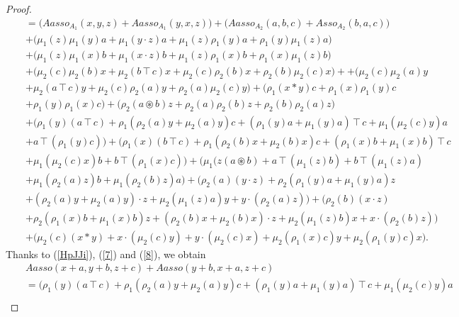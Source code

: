 \documentclass[12pt]{amsart}
\begin{document}
\begin{proof}
\begin{eqnarray}
			&&
			=\Big(Aasso_{A_1}(x,y,z)+Aasso_{A_1}(y,x,z)\Big)
			+\Big(Aasso_{A_2}(a,b,c)+Asso_{A_2}(b,a,c)\Big)\nonumber\\
			&&+
			\Big(\mu_1(z)\mu_1(y)a+\mu_1(y\cdot z)a+\mu_1(z)\rho_1(y)a
			+\rho_1(y)\mu_1(z)a \Big)\nonumber\\
			&&+	\Big(\mu_1(z)\mu_1(x)b+\mu_1(x\cdot z)b+\mu_1(z)\rho_1(x)b+\rho_1(x)\mu_1(z)b \Big)\nonumber\\
			&&+\Big(\mu_2(c)\mu_2(b)x+\mu_2(b\intercal c)x+\mu_2(c)\rho_2(b)x+\rho_2(b)\mu_2(c)x \Big)+
			+\Big(\mu_2(c)\mu_2(a)y\nonumber\\
			&&+\mu_2(a\intercal c)y+\mu_2(c)\rho_2(a)y+\rho_2(a)\mu_2(c)y \Big)+
			\Big(\rho_1(x\ast y)c+\rho_1(x)\rho_1(y)c\nonumber\\
			&&+ \rho_1(y)\rho_1(x)c\Big)+\Big(\rho_2(a\circledast b)z+\rho_2(a)\rho_2(b)z+ \rho_2(b)\rho_2(a)z\Big)\nonumber
		\end{eqnarray}
		\begin{eqnarray}		
			&&+
			\Big( \rho_1(y)(a\intercal c)+\rho_1(\rho_2(a)y+\mu_2(a)y)c+(\rho_1(y)a+\mu_1(y)a)\intercal c+\mu_1(\mu_2(c)y)a\nonumber\\
			&&+a\intercal(\rho_1(y)c)\Big)
			+\Big( \rho_1(x)(b\intercal c)+\rho_1(\rho_2(b)x+\mu_2(b)x)c+(\rho_1(x)b+\mu_1(x)b)\intercal c\nonumber\\
			&&+\mu_1(\mu_2(c)x)b
			+b\intercal(\rho_1(x)c)\Big)
			+\Big(\mu_1(z(a\circledast b)+a\intercal(\mu_1(z)b)+b\intercal(\mu_1(z)a)\nonumber\\
			&&+\mu_1(\rho_2(a)z)b+\mu_1(\rho_2(b)z)a   \Big)+
			\Big(\rho_2(a)(y\cdot z)+\rho_2(\rho_1(y)a+\mu_1(y)a)z\nonumber\\
			&&+(\rho_2(a)y+\mu_2(a)y)\cdot z+\mu_2(\mu_1(z)a)y+y\cdot(\rho_2(a)z) \Big)+\Big(\rho_2(b)(x\cdot z)\nonumber\\
			&&+\rho_2(\rho_1(x)b+\mu_1(x)b)z+(\rho_2(b)x+\mu_2(b)x)\cdot z+\mu_2(\mu_1(z)b)x+x\cdot(\rho_2(b)z) \Big)\nonumber\\
			&&+\Big(\mu_2(c)(x\ast y)+x\cdot(\mu_2(c)y)+y\cdot(\mu_2(c)x)
			+\mu_2(\rho_1(x)c)y+\mu_2(\rho_1(y)c)x \Big).\nonumber
		\end{eqnarray}
		Thanks to  (\ref{HpJJi}), (\ref{7}) and (\ref{8}), we obtain
		\begin{eqnarray}
			&&Aasso(x+a,y+b,z+c)+Aasso(y+b,x+a,z+c)
			\nonumber\\ 
			&&=\Big( \rho_1(y)(a\intercal c)+\rho_1(\rho_2(a)y+\mu_2(a)y)c+(\rho_1(y)a+\mu_1(y)a)\intercal c+\mu_1(\mu_2(c)y)a\nonumber\\

\end{eqnarray}
\end{proof}
\end{document}
